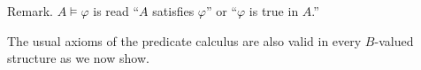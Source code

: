 Remark. $A \models \varphi$ is read “$A$ satisfies $\varphi$” or “$\varphi$ is true in $A$.”

The usual axioms of the predicate calculus are also valid in every $B$-valued structure as we now show.
